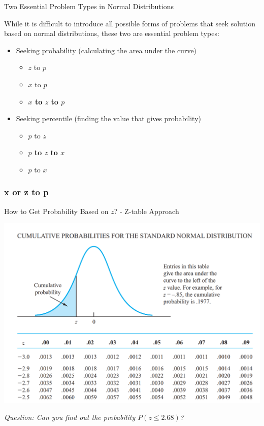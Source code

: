 \documentclass{beamer}
\begin{document}
\begin{frame}{Two Essential Problem Types in Normal Distributions }

While it is difficult to introduce all possible forms of problems that seek solution based on normal distributions, these two are essential problem types:

\vspace{0.3 cm}

\begin{itemize}
\item Seeking probability (calculating the area under the curve)
\begin{itemize}
\item $z$ to $p$
\item $x$ to $p$
\item \textbf{$x$ to $z$ to $p$}
\end{itemize}
\item Seeking percentile (finding the value that gives probability)

\begin{itemize}
\item $p$ to $z$
\item \textbf{$p$ to $z$ to $x$}
\item $p$ to $x$
\end{itemize}

\end{itemize}

\end{frame}







\subsubsection{x or z to p}

\begin{frame}{How to Get Probability Based on $z$? - Z-table Approach}

\includegraphics[scale=0.4]{images/section4zTableLookup.png}

\begin{center}
\textit{Question: Can you find out the probability $P(z \leq 2.68)$?}
\end{center}
\end{frame}
\end{document}
